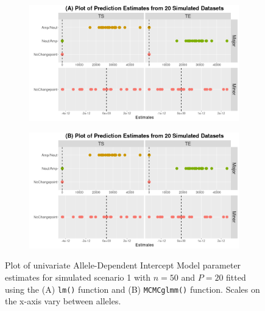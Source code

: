 \begin{figure}[H]
\vspace{0.5cm}
     \begin{subfigure}[t]{.49\textwidth}
      \centering
     \includegraphics[width = 1\textwidth]{../figures/Chapter_5/Uni_lm_Prediction_Simulation.png}
    \end{subfigure}%
     \begin{subfigure}[t]{.49\textwidth}
      \centering
       \includegraphics[width = 1\textwidth]{../figures/Chapter_5/Uni_MCMC_Prediction_Simulation.png}
    \end{subfigure} 
     \caption[Plot of univariate Allele-Dependent Intercept Model parameter estimates for simulated scenario 1 with $n = 50$ and $P = 20$.]{Plot of univariate Allele-Dependent Intercept Model parameter estimates for simulated scenario 1 with $n = 50$ and $P = 20$ fitted using the (A) \texttt{lm()} function and (B) \texttt{MCMCglmm()} function. Scales on the x-axis vary between alleles.}
     \label{fig:DP_1}
\end{figure}

